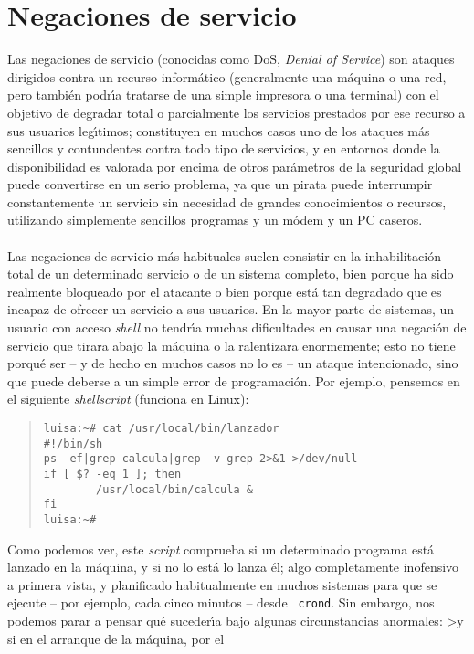 \section{Negaciones de servicio}
Las negaciones de servicio (conocidas como DoS, {\it Denial of Service}) son
ataques dirigidos contra un recurso inform\'atico (generalmente una m\'aquina o
una red, pero tambi\'en podr\'{\i}a tratarse de una simple impresora o una
terminal) con el objetivo de degradar total o parcialmente los servicios 
prestados por ese recurso a sus usuarios leg\'{\i}timos; constituyen en muchos 
casos uno de los ataques m\'as sencillos y contundentes contra todo tipo de 
servicios, y en entornos donde la disponibilidad es valorada por encima de otros
par\'ametros de la seguridad global puede convertirse en un serio problema, ya
que un pirata puede interrumpir constantemente un servicio sin necesidad de 
grandes conocimientos o recursos, utilizando simplemente sencillos programas y 
un m\'odem y un PC caseros.\\
\\Las negaciones de servicio m\'as habituales suelen consistir en la
inhabilitaci\'on total de un determinado servicio o de un sistema completo, bien
porque ha sido realmente bloqueado por el atacante o bien porque est\'a tan 
degradado que es incapaz de ofrecer un servicio a sus usuarios. En la mayor
parte de sistemas, un usuario con acceso {\it shell} no tendr\'{\i}a muchas
dificultades en causar una negaci\'on de servicio que tirara abajo la m\'aquina 
o la ralentizara enormemente; esto no tiene porqu\'e ser -- y de hecho en muchos
casos no lo es -- un ataque intencionado, sino que puede deberse a un simple
error de programaci\'on. Por ejemplo, pensemos en el siguiente {\it 
shellscript} (funciona en Linux):
\begin{quote}
\begin{verbatim}
luisa:~# cat /usr/local/bin/lanzador
#!/bin/sh
ps -ef|grep calcula|grep -v grep 2>&1 >/dev/null
if [ $? -eq 1 ]; then
        /usr/local/bin/calcula &
fi
luisa:~# 
\end{verbatim}
\end{quote}
Como podemos ver, este {\it script} comprueba si un determinado programa
est\'a lanzado en la m\'aquina, y si no lo est\'a lo lanza \'el; algo 
completamente inofensivo a primera vista, y planificado habitualmente en muchos 
sistemas para que se ejecute -- por ejemplo, cada cinco minutos -- desde {\tt
crond}. Sin embargo, nos podemos parar a pensar qu\'e suceder\'{\i}a bajo 
algunas circunstancias anormales: >y si en el arranque de la m\'aquina, por el 
